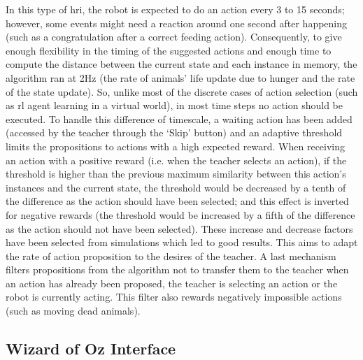 In this type of \gls{hri}, the robot is expected to do an action every 3 to 15 seconds; however, some events might need a reaction around one second after happening (such as a congratulation after a correct feeding action). Consequently, to give enough flexibility in the timing of the suggested actions and enough time to compute the distance between the current state and each instance in memory, the algorithm ran at 2Hz (the rate of animals' life update due to hunger and the rate of the state update). So, unlike most of the discrete cases of action selection (such as \gls{rl} agent learning in a virtual world), in most time steps no action should be executed. To handle this difference of timescale, a waiting action has been added (accessed by the teacher through the `Skip' button) and an adaptive threshold limits the propositions to actions with a high expected reward. When receiving an action with a positive reward (i.e. when the teacher selects an action), if the threshold is higher than the previous maximum similarity between this action's instances and the current state, the threshold would be decreased by a tenth of the difference as the action should have been selected; and this effect is inverted for negative rewards (the threshold would be increased by a fifth of the difference as the action should not have been selected). These increase and decrease factors have been selected from simulations which led to good results. This aims to adapt the rate of action proposition to the desires of the teacher. A last mechanism filters propositions from the algorithm not to transfer them to the teacher when an action has already been proposed, the teacher is selecting an action or the robot is currently acting. This filter also rewards negatively impossible actions (such as moving dead animals).

\subsection{Wizard of Oz Interface} \label{sec:tuto_woz}

